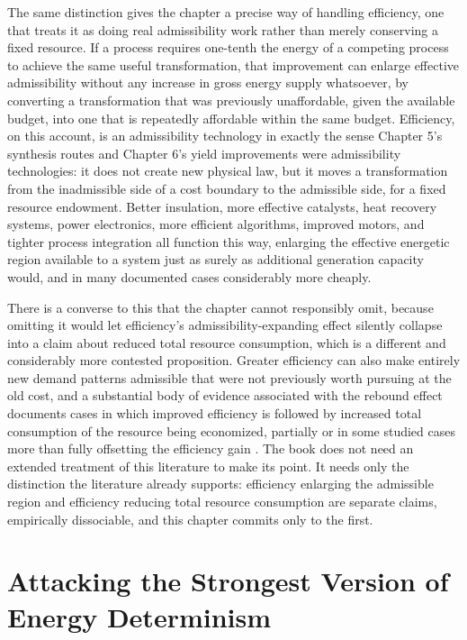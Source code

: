 \documentclass[11pt]{book}
\begin{document}
The same distinction gives the chapter a precise way of handling efficiency, one that treats it as doing real admissibility work rather than merely conserving a fixed resource. If a process requires one-tenth the energy of a competing process to achieve the same useful transformation, that improvement can enlarge effective admissibility without any increase in gross energy supply whatsoever, by converting a transformation that was previously unaffordable, given the available budget, into one that is repeatedly affordable within the same budget. Efficiency, on this account, is an admissibility technology in exactly the sense Chapter 5's synthesis routes and Chapter 6's yield improvements were admissibility technologies: it does not create new physical law, but it moves a transformation from the inadmissible side of a cost boundary to the admissible side, for a fixed resource endowment. Better insulation, more effective catalysts, heat recovery systems, power electronics, more efficient algorithms, improved motors, and tighter process integration all function this way, enlarging the effective energetic region available to a system just as surely as additional generation capacity would, and in many documented cases considerably more cheaply.

There is a converse to this that the chapter cannot responsibly omit, because omitting it would let efficiency's admissibility-expanding effect silently collapse into a claim about reduced total resource consumption, which is a different and considerably more contested proposition. Greater efficiency can also make entirely new demand patterns admissible that were not previously worth pursuing at the old cost, and a substantial body of evidence associated with the rebound effect documents cases in which improved efficiency is followed by increased total consumption of the resource being economized, partially or in some studied cases more than fully offsetting the efficiency gain \cite{sorrell2009}. The book does not need an extended treatment of this literature to make its point. It needs only the distinction the literature already supports: efficiency enlarging the admissible region and efficiency reducing total resource consumption are separate claims, empirically dissociable, and this chapter commits only to the first.

\section{Attacking the Strongest Version of Energy Determinism}
\end{document}

